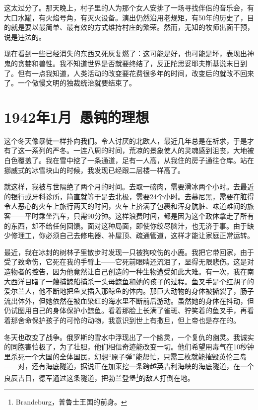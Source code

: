 \documentclass[UTF8]{ctexart}
\begin{document}
这太过分了。那天晚上，村子里的人为那个女人安排了一场寻找伴侣的音乐会，有大口水罐，有火焰号角，有灭火设备。演出仍然沿用老规矩，有50年的历史了，目的就是要以最简单、最有效的方式维持村庄的繁荣。然而，无知的牧师出面干预，说是违法的。

现在看到一些已经消失的东西又死灰复燃了：这可能是好，也可能是坏，表现出神鬼的贪婪和兽性。我不知道世界是否就要终结了，反正陀思妥耶夫斯基说末日到了。但有一点我知道，人类活动的改变要花费很多年的时间，改变后的就改不回来了。一个傲慢文明的独裁统治就要结束了。

\section{1942年1月\ 愚钝的理想}

这个冬天像暴徒一样扑向我们。令人讨厌的北欧人，最近几年总是在祈求，于是才有了这一系列的严冬。一连八周的时间，荒凉的景象使人的灵魂感到沮丧，大地被白色覆盖了。我在雪中挖了一条通道，足有一人高，从我住的房子通往仓库。站在挪威式的冰雪块山的时候，我发现已经跟二层楼一样高了。

就这样，我被与世隔绝了两个月的时间。去取一磅肉，需要滑冰两个小时。去最近的银行或牙科诊所，简直就等于是去北极，需要24个小时。去慕尼黑，需要在脏得令人恶心的火车上旅行两天的时间，火车上挤满了包裹和浑身肮脏、味道难闻的旅客——平时乘坐汽车，只需90分钟。这样浪费时间，都是因为这个政体拿走了所有的东西，却不给任何回馈。面对这种局面，即使你绞尽脑汁，也无济于事。由于缺少修理工，你必须自己去修电器、补屋顶、疏通管道，这样才能让家庭正常运转。

最近，我在冰封的树林子里散步时发现一只被狗咬伤的小鹿。我把它带回家，由于受了致命伤，它死在我的手臂上——它死前眼睛还流泪了，显得无限悲伤。这是对造物者的控告，因为他竟然让自己创造的一种生物遭受如此大难。有一次，我在南大西洋目睹了一艘捕鲸船捕杀一头母鲸鱼和她的孩子的过程。鱼叉手是个红胡子的爱尔兰人，他不断地把鱼叉插入那鲸鱼的体内。那巨大动物的身体被撕裂了，肠子流出体外，但她依然在被血染红的海水里不断前后游动。虽然她的身体在抖动，但仍试图用自己的身体保护小鲸鱼。看着那脸上长满了雀斑、狞笑着的鱼叉手，再看着那舍命保护孩子的可怜的动物，我意识到世上有撒旦，但上帝也是存在的。

冬天也改变了战争。俄罗斯的雪水中浮现出了一个幽灵，一个复仇的幽灵。我诚实的同胞害怕极了，为了壮胆，他们相信奇迹能改变一切。他们希望用毒气在10秒钟里杀死一个大国的全体国民，幻想“原子弹”能帮忙，只需三枚就能摧毁英伦三岛——对，还有海底隧道，据说正在加莱挖一条跨越英吉利海峡的海底隧道，在一个良辰吉日，德军通过这条隧道，把勃兰登堡\footnote{Brandeburg，普鲁士王国的前身。}的敌人打倒在地。
\end{document}
